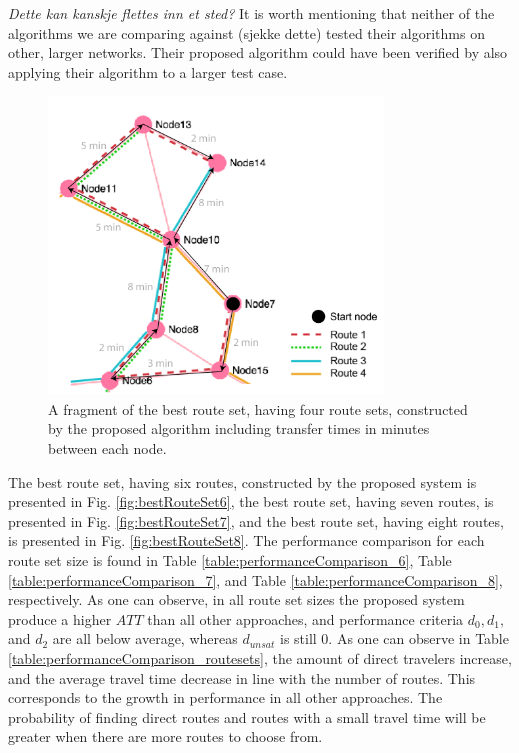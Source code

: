 \emph{\color{blue}Dette kan kanskje flettes inn et sted?}
It is worth mentioning that neither of the algorithms we are comparing against (sjekke dette) tested their algorithms on other, larger networks. Their proposed algorithm could have been verified by also applying their algorithm to a larger test case.


\begin{figure}[H]
    \begin{center}
    \includegraphics[width=3.5in]{assets/mandl_withTT_utsnitt.png}
    \end{center}
    \caption{A fragment of the best route set, having four route sets, constructed by the proposed algorithm including transfer times in minutes between each node.}
    \label{fig:mandlWithTT} 
\end{figure}

The best route set, having six routes, constructed by the proposed system is presented in Fig. \vref{fig:bestRouteSet6}, the best route set, having seven routes, is presented in Fig. \vref{fig:bestRouteSet7}, and the best route set, having eight routes, is presented in Fig. \vref{fig:bestRouteSet8}. The performance comparison for each route set size is found in Table \vref{table:performanceComparison_6}, Table \vref{table:performanceComparison_7}, and Table \vref{table:performanceComparison_8}, respectively. As one can observe, in all route set sizes the proposed system produce a higher $ATT$ than all other approaches, and performance criteria $d_0, d_1,$ and $d_{2}$ are all below average, whereas $d_{unsat}$ is still 0.   As one can observe in Table \vref{table:performanceComparison_routesets}, the amount of direct travelers increase, and the average travel time decrease in line with the number of routes. This corresponds to the growth in performance in all other approaches. The probability of finding direct routes and routes with a small travel time will be greater when there are more routes to choose from. 

